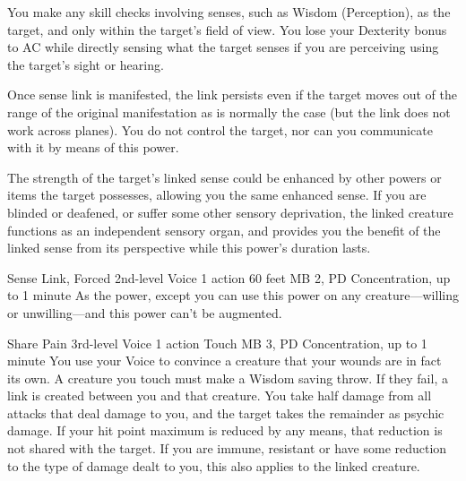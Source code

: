   You make any skill checks involving senses,
  such as Wisdom (Perception), as the target,
  and only within the target's field of view.
  You lose your Dexterity bonus to AC while
  directly sensing what the target senses
  if you are perceiving using the target's sight or hearing.
  
  Once sense link is manifested, the link persists
  even if the target moves out of the range
  of the original manifestation as is normally the case
  (but the link does not work across planes).
  You do not control the target,
  nor can you communicate with it by means of this power.
  
  The strength of the target's linked sense could be enhanced
  by other powers or items the target possesses,
  allowing you the same enhanced sense.
  If you are blinded or deafened, or suffer some other sensory deprivation,
  the linked creature functions as an independent sensory organ,
  and provides you the benefit of the linked sense from its perspective
  while this power's duration lasts.

\DndPowerHeader%
  {Sense Link, Forced}
  {2nd-level Voice}
  {1 action}
  {60 feet}
  {MB 2, PD \lvltwo}
  {Concentration, up to 1 minute}
As the  power,
except you can use this power on any creature---willing or
unwilling---and this power can't be augmented.

\DndPowerHeader%
  {Share Pain}
  {3rd-level Voice}
  {1 action}
  {Touch}
  {MB 3, PD \lvlthree}
  {Concentration, up to 1 minute}
  You use your Voice to convince a creature that your wounds are
  in fact its own.
  A creature you touch must make a Wisdom saving throw.
  If they fail, a link is created between you and that creature.
  You take half damage from all attacks that deal damage to you,
  and the target takes the remainder as psychic damage.
  If your hit point maximum is reduced by any means,
  that reduction is not shared with the target.
  If you are immune, resistant or have some reduction
  to the type of damage dealt to you,
  this also applies to the linked creature. 
  
